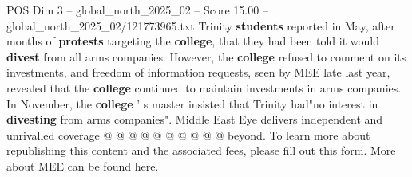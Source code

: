 \begin{textsample}{POS Dim 3 – global\_north\_2025\_02 – Score 15.00 – global\_north\_2025\_02/121773965.txt}
Trinity \textbf{students} reported in May, after months of \textbf{protests} targeting the \textbf{college}, that they had been told it would \textbf{divest} from all arms companies.
However, the \textbf{college} refused to comment on its investments, and freedom of information requests, seen by MEE late last year, revealed that the \textbf{college} continued to maintain investments in arms companies.
In November, the \textbf{college} ' s master insisted that Trinity had"no interest in \textbf{divesting} from arms companies".
Middle East Eye delivers independent and unrivalled coverage @ @ @ @ @ @ @ @ @ @ beyond.
To learn more about republishing this content and the associated fees, please fill out this form.
More about MEE can be found here.

\end{textsample}
